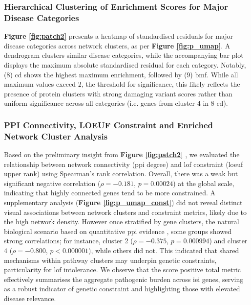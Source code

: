 \FloatBarrier
\subsubsection{Hierarchical Clustering of Enrichment Scores for Major Disease Categories}
\textbf{Figure \ref{fig:patch2}} presents a heatmap of standardised residuals for major disease categories across network clusters, as per \textbf{Figure \ref{fig:p_umap}}. 
A dendrogram clusters similar disease categories, while the accompanying bar plot displays the maximum absolute standardised residual for each category.
Notably, (8) \ac{cd} shows the highest maximum enrichment, followed by 
(9) \ac{bmf}. 
While all maximum values exceed 2, the threshold for significance, this likely reflects the presence of protein clusters with strong damaging variant scores rather than uniform significance across all categories (i.e. genes from cluster 4 in 8 \ac{cd}).


\subsubsection{PPI Connectivity, LOEUF Constraint and Enriched Network Cluster Analysis}

Based on the preliminary insight from \textbf{Figure \ref{fig:patch2}} ,
we evaluated the relationship between network connectivity (\ac{ppi} degree) and \ac{lof} constraint (\ac{loeuf} upper rank) \citet{karczewski2020mutational} using Spearman’s rank correlation.
Overall, there was a weak but significant negative correlation ($\rho = -0.181$, $p = 0.00024$) at the global scale, indicating that highly connected genes tend to be more constrained. 
A supplementary analysis (\textbf{Figure \ref{fig:p_umap_const}})
did not reveal distinct visual associations between network clusters and constraint metrics, likely due to the high network density. 
However once stratified by gene clusters, the natural biological scenario based on quantitative \ac{ppi} evidence \cite{szklarczyk2025string},
some groups showed strong correlations; for instance, cluster 2 ($\rho = -0.375$, $p = 0.000994$) and cluster 4 ($\rho = -0.800$, $p < 0.000001$), while others did not.
This indicated that shared mechanisms within pathway clusters may underpin genetic constraints, particularity for \ac{lof} intolerance. We observe that the score positive total metric effectively summarises the aggregate pathogenic burden across \ac{iei} genes, serving as a robust indicator of genetic constraint and highlighting those with elevated disease relevance.

